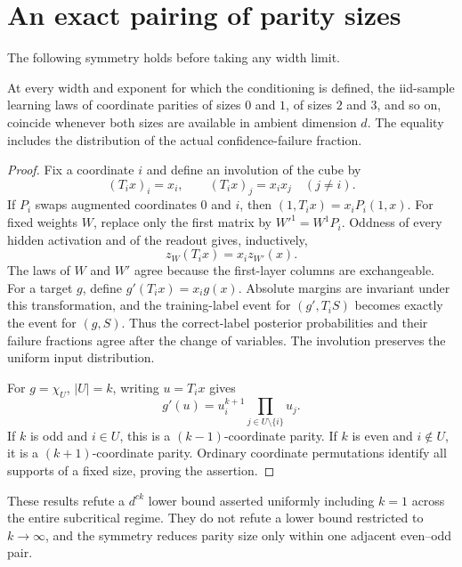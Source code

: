 \section{An exact pairing of parity sizes}
\label{sec:projective-symmetry}
The following symmetry holds before taking any width limit.
\begin{proposition}
\label{prop:projective-symmetry}
At every width and exponent for which the conditioning is defined,
the iid-sample learning laws of coordinate parities of sizes
$0$ and $1$, of sizes $2$ and $3$, and so on, coincide whenever
both sizes are available in ambient dimension $d$. The equality
includes the distribution of the actual confidence-failure fraction.
\end{proposition}
\begin{proof}
Fix a coordinate $i$ and define an involution of the cube by
\[
 (T_ix)_i=x_i,\qquad (T_ix)_j=x_ix_j\quad(j\ne i).
\]
If $P_i$ swaps augmented coordinates $0$ and $i$, then
$(1,T_ix)=x_iP_i(1,x)$. For fixed weights $W$, replace only the first
matrix by $W'^1=W^1P_i$. Oddness of every hidden activation and of
the readout gives, inductively,
\[
 z_W(T_ix)=x_i z_{W'}(x).
\]
The laws of $W$ and $W'$ agree because the first-layer columns are
exchangeable. For a target $g$, define $g'(T_ix)=x_ig(x)$.
Absolute margins are invariant under this transformation, and the
training-label event for $(g',T_iS)$ becomes exactly the event for
$(g,S)$. Thus the correct-label posterior probabilities and their
failure fractions agree after the change of variables. The involution
preserves the uniform input distribution.

For $g=\chi_U$, $|U|=k$, writing $u=T_ix$ gives
\[
 g'(u)=u_i^{k+1}\prod_{j\in U\setminus\{i\}}u_j.
\]
If $k$ is odd and $i\in U$, this is a $(k-1)$-coordinate parity.
If $k$ is even and $i\notin U$, it is a $(k+1)$-coordinate parity.
Ordinary coordinate permutations identify all supports of a fixed
size, proving the assertion.
\end{proof}

These results refute a $d^{c k}$ lower bound asserted uniformly
including $k=1$ across the entire subcritical regime. They do not
refute a lower bound restricted to $k\to\infty$, and the symmetry
reduces parity size only within one adjacent even--odd pair.
